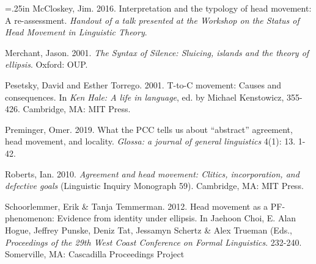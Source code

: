 \documentclass[]{ling-200b-2}
\makeatletter
\newcommand{\hangpara}[2]{\hangindent#1\hangafter#2\noindent}
\newenvironment{hangparas}[2]{\setlength{\parindent}{\z@}%
  \everypar={\hangpara{#1}{#2}}}{\par}
\makeatother
\begin{document}
\begin{hangparas}{.25in}{1}
McCloskey, Jim. 2016. Interpretation and the typology of head movement: A re-assessment. \textit{Handout of a talk presented at the Workshop on the Status of Head Movement in Linguistic Theory}.

Merchant, Jason. 2001. \textit{The Syntax of Silence: Sluicing, islands and the theory of ellipsis}. Oxford: OUP.

Pesetsky, David and Esther Torrego. 2001. T-to-C movement: Causes and consequences. In \textit{Ken Hale: A life in language}, ed. by Michael Kenstowicz, 355-426. Cambridge, MA: MIT Press.

Preminger, Omer. 2019. What the PCC tells us about ``abstract'' agreement, head movement, and locality. \textit{Glossa: a journal of general linguistics} 4(1): 13. 1-42.

Roberts, Ian. 2010. \textit{Agreement and head movement: Clitics, incorporation, and defective goals} (Linguistic Inquiry Monograph 59). Cambridge, MA: MIT Press.

Schoorlemmer, Erik \& Tanja Temmerman. 2012. Head movement as a PF-phenomenon: Evidence from identity under ellipsis. In Jaehoon Choi, E. Alan Hogue, Jeffrey Punske, Deniz Tat, Jessamyn Schertz \& Alex Trueman (Eds., \textit{Proceedings of the 29th West Coast Conference on Formal Linguistics}. 232-240. Somerville, MA: Cascadilla Proceedings Project
\end{hangparas}
\end{document}
